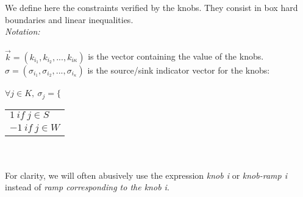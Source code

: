 We define here the constraints verified by the knobs. They consist in box hard boundaries and linear inequalities.
\\
\emph{Notation:}\\
\\
$\vec{k}=(k_{i_{1}},k_{i_{2}},...,k_{i{\kappa}})$ is the vector containing the value of the knobs.\\
$\sigma=(\sigma_{i_{1}},\sigma_{i_{2}},...,\sigma_{i_{\kappa}})$ is the source/sink indicator vector for the knobs: \\
\\
$\forall j\in{K}, \ \sigma_{j}=\bigg\{$
\begin{tabular}{l}
	$1\ if\ j\in{S}$ \\
	$-1\ if\ j\in{W}$ \\
\end{tabular}\\
\\
For clarity, we will often abusively use the expression \emph{knob i} or \emph{knob-ramp i} instead of \emph{ramp corresponding to the knob i}.